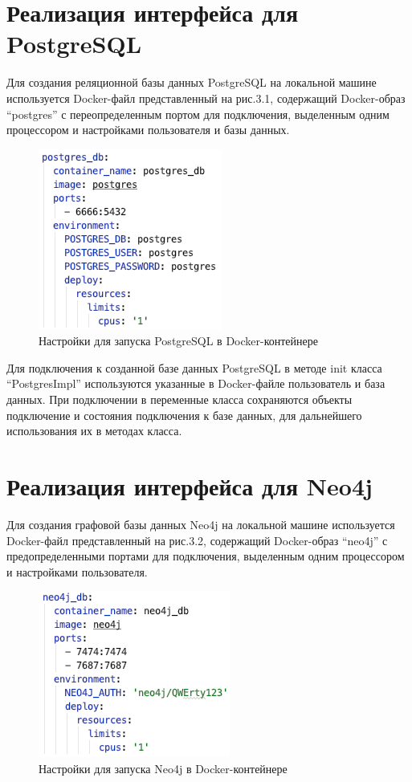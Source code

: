 \section{Реализация интерфейса для PostgreSQL}

Для создания реляционной базы данных PostgreSQL на локальной машине используется Docker-файл представленный на рис.3.1, содержащий
Docker-образ “postgres” с переопределенным портом для подключения, выделенным одним процессором и настройками пользователя и базы данных.

\begin{figure}[ht!]
    \center
    \includegraphics [scale=0.7] {my_folder/myimg//4}
    \caption{Настройки для запуска PostgreSQL в Docker-контейнере}
\end{figure}

Для подключения к созданной базе данных PostgreSQL в методе init класса “PostgresImpl” используются указанные в Docker-файле пользователь и
база данных. При подключении в переменные класса сохраняются объекты подключение и состояния подключения к базе данных, для дальнейшего
использования их в методах класса.


\section{Реализация интерфейса для Neo4j}

Для создания графовой базы данных Neo4j на локальной машине используется Docker-файл представленный на рис.3.2, содержащий Docker-образ
“neo4j” с предопределенными портами для подключения, выделенным одним процессором и настройками пользователя.

\begin{figure}[ht!]
    \center
    \includegraphics [scale=0.7] {my_folder/myimg//5}
    \caption{Настройки для запуска Neo4j в Docker-контейнере}
\end{figure}

